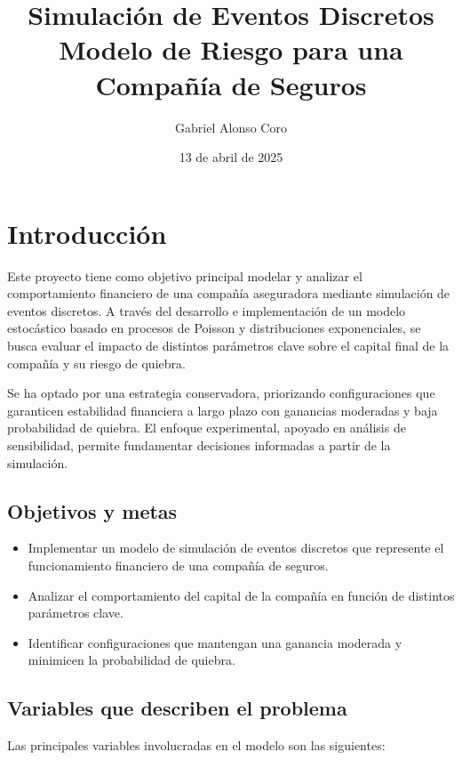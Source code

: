 \documentclass[12pt]{article}
\title{\textbf{Simulación de Eventos Discretos\\
Modelo de Riesgo para una Compañía de Seguros}}
\author{Gabriel Alonso Coro}
\date{13 de abril de 2025}
\begin{document}
\maketitle
\tableofcontents
\newpage

\section{Introducción}

Este proyecto tiene como objetivo principal modelar y analizar el comportamiento financiero de una compañía aseguradora mediante simulación de eventos discretos. A través del desarrollo e implementación de un modelo estocástico basado en procesos de Poisson y distribuciones exponenciales, se busca evaluar el impacto de distintos parámetros clave sobre el capital final de la compañía y su riesgo de quiebra.

Se ha optado por una estrategia conservadora, priorizando configuraciones que garanticen estabilidad financiera a largo plazo con ganancias moderadas y baja probabilidad de quiebra. El enfoque experimental, apoyado en análisis de sensibilidad, permite fundamentar decisiones informadas a partir de la simulación.

\subsection*{Objetivos y metas}
\begin{itemize}
    \item Implementar un modelo de simulación de eventos discretos que represente el funcionamiento financiero de una compañía de seguros.
    \item Analizar el comportamiento del capital de la compañía en función de distintos parámetros clave.
    \item Identificar configuraciones que mantengan una ganancia moderada y minimicen la probabilidad de quiebra.
\end{itemize}

\subsection*{Variables que describen el problema}

Las principales variables involucradas en el modelo son las siguientes:
\end{document}
